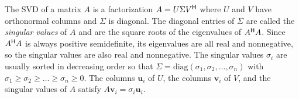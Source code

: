 \begin{comment} %
The \emph{Singular Value Decomposition} is so important that it was discovered multiple times by different people in different ways.
The foundation work in systems of linear equations was laid by Gauss and Cauchy in the 1820's and later by Jacobi in 1846 with his work with the LU decomposition; however, the real work with the SVD started with Eugenio Beltrami.
In a paper he published in 1873 he was the first to work with the SVD; he was limited to real, square, nonsingular matrices with distinct singular values.
A year later, Camille Jordan published his own independent work that was more rigorous and avoided some of the pitfalls of Beltrami's research.
Together, Beltrami and Jordan are considered the co-discoverers of the singular value decomposition.

Later, James Joseph Sylvester independently presented an iterative algorithm and a rule for carrying out the reduction in 1889.
This rule was essentially Beltrami's work.
However Sylvester sent the note detailing his rule to the same journal Jordan had published in, showing not just his ignorance of Jordan's and Beltrami's works but his perception of the importance of the SVD.

The concurrent and independent derivation of the SVD shows its importance as a theoretical tool, but it wasn't until Erhard Schmidt discovered a computational use for the SVD that the practical applications became apparent.
Schmidt used integral equations rather than linear equations to derive the SVD, but his most important contribution was showing how the SVD could be a computational tool to obtain optimal, low-rank approximations.

Since Schmidt's work, further developments have confirmed the importance of the SVD in both practical and theoretical applications.
\end{comment}

The SVD of a matrix $A$ is a factorization $A = U \Sigma V^{\mathsf H}$ where $U$ and $V$ have orthonormal columns and $\Sigma$ is diagonal.
The diagonal entries of $\Sigma$ are called the \emph{singular values} of $A$ and are the square roots of the eigenvalues of $A^{\mathsf H} A$.
Since $A^{\mathsf H} A$ is always positive semidefinite, its eigenvalues are all real and nonnegative, so the singular values are also real and nonnegative.
The singular values $\sigma_i$ are usually sorted in decreasing order so that $ \Sigma = \mbox{diag}(\sigma_1,\sigma_2,\ldots,\sigma_n)$ with $\sigma_1 \geq \sigma_2 \geq \ldots \geq \sigma_n \geq 0$.
The columns $\mathbf{u}_i$ of $U$, the columns $\mathbf{v}_i$ of $V$, and the singular values of $A$ satisfy $A\mathbf{v}_i = \sigma_i \mathbf{u}_i$.

